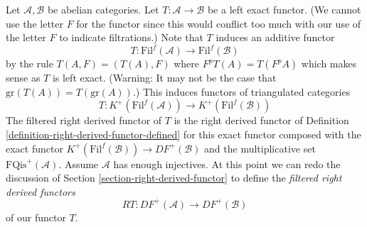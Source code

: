 \noindent
Let $\mathcal{A}, \mathcal{B}$ be abelian categories.
Let $T : \mathcal{A} \to \mathcal{B}$ be a left exact functor.
(We cannot use the letter $F$ for the functor since this would
conflict too much with our use of the letter $F$ to indicate
filtrations.) Note that $T$ induces an additive functor
$$
T : \text{Fil}^f(\mathcal{A}) \to \text{Fil}^f(\mathcal{B})
$$
by the rule $T(A, F) = (T(A), F)$ where $F^pT(A) = T(F^pA)$ which makes
sense as $T$ is left exact. (Warning: It may not be the case that
$\text{gr}(T(A)) = T(\text{gr}(A))$.)
This induces functors of triangulated categories
\begin{equation}
\label{equation-induced-T-filtered}
T :
K^{+}(\text{Fil}^f(\mathcal{A}))
\longrightarrow
K^{+}(\text{Fil}^f(\mathcal{B}))
\end{equation}
The filtered right derived functor of $T$ is the right derived functor of
Definition \ref{definition-right-derived-functor-defined}
for this exact functor composed with the exact functor
$K^{+}(\text{Fil}^f(\mathcal{B})) \to DF^{+}(\mathcal{B})$ and the
multiplicative set $\text{FQis}^{+}(\mathcal{A})$.
Assume $\mathcal{A}$ has enough injectives. At this point we can redo the
discussion of
Section \ref{section-right-derived-functor}
to define the
{\it filtered right derived functors}
\begin{equation}
\label{equation-filtered-derived-functor}
RT : DF^{+}(\mathcal{A}) \longrightarrow DF^{+}(\mathcal{B})
\end{equation}
of our functor $T$.

